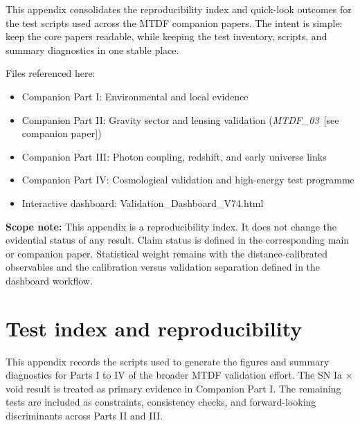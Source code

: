 \documentclass[11pt,a4paper]{article}
\begin{document}
This appendix consolidates the reproducibility index and quick-look outcomes for the test scripts used across the MTDF companion papers.
  The intent is simple: keep the core papers readable, while keeping the test inventory, scripts, and summary diagnostics in one stable place.

Files referenced here:

\begin{itemize}
  \item Companion Part I: Environmental and local evidence
  \item Companion Part II: Gravity sector and lensing validation (\textit{MTDF\_\allowbreak{}03}~[see companion paper])
  \item Companion Part III: Photon coupling, redshift, and early universe links
  \item Companion Part IV: Cosmological validation and high-energy test programme
  \item Interactive dashboard: Validation\_\allowbreak{}Dashboard\_\allowbreak{}V74.html
\end{itemize}

\begin{mdframed}[linecolor=accent,linewidth=0.5pt,backgroundcolor=callout-bg,leftline=true,rightline=true,topline=true,bottomline=true,innerleftmargin=8pt,innerrightmargin=8pt,innertopmargin=6pt,innerbottommargin=6pt]
\textbf{Scope note:}
    This appendix is a reproducibility index. It does not change the evidential status of any result. Claim status is defined in the corresponding main or companion paper. Statistical weight remains with the distance-calibrated observables and the calibration versus validation separation defined in the dashboard workflow.
\end{mdframed}

\section{Test index and reproducibility}
\label{sec:appendix-a}
This appendix records the scripts used to generate the figures and summary diagnostics for Parts I to IV of the broader MTDF validation effort.
The SN Ia $\times$ void result is treated as primary evidence in Companion Part I. The remaining tests are included as constraints, consistency checks, and forward-looking discriminants across Parts II and III.
\end{document}
